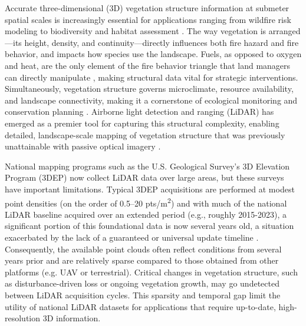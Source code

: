 \documentclass[preprint,12pt,authoryear]{elsarticle}
\begin{document}
Accurate three-dimensional (3D) vegetation structure information at submeter spatial scales is increasingly essential for applications ranging from wildfire risk modeling \citep{martin-ducup_unlocking_2025} to biodiversity and habitat assessment \citep{Merrick2013Into3D,moudry2023vegetation}. The way vegetation is arranged—its height, density, and continuity—directly influences both fire hazard and fire behavior, and impacts how species use the landscape. Fuels, as opposed to oxygen and heat, are the only element of the fire behavior triangle that land managers can directly manipulate \citep{agee_influence_1996}, making structural data vital for strategic interventions. Simultaneously, vegetation structure governs microclimate, resource availability, and landscape connectivity, making it a cornerstone of ecological monitoring and conservation planning \citep{guo2018integrating, mahata2023microclimate,ustin2021current}. Airborne light detection and ranging (LiDAR) has emerged as a premier tool for capturing this structural complexity, enabling detailed, landscape-scale mapping of vegetation structure that was previously unattainable with passive optical imagery \citep{Merrick2013Into3D, belov2019capabilities, guo2020lidar}. 

National mapping programs such as the U.S. Geological Survey's 3D Elevation Program (3DEP) now collect LiDAR data over large areas, but these surveys have important limitations. Typical 3DEP acquisitions are performed at modest point densities (on the order of 0.5–20 pts/m\textsuperscript{2}) \citep{wu2016evaluating} and with much of the national LiDAR baseline acquired over an extended period (e.g., roughly 2015-2023), a significant portion of this foundational data is now several years old, a situation exacerbated by the lack of a guaranteed or universal update timeline \citep{usgs_what_2019}. Consequently, the available point clouds often reflect conditions from several years prior and are relatively sparse compared to those obtained from other platforms (e.g. UAV or terrestrial). Critical changes in vegetation structure, such as disturbance-driven loss or ongoing vegetation growth, may go undetected between LiDAR acquisition cycles. This sparsity and temporal gap limit the utility of national LiDAR datasets for applications that require up-to-date, high-resolution 3D information.
\end{document}
